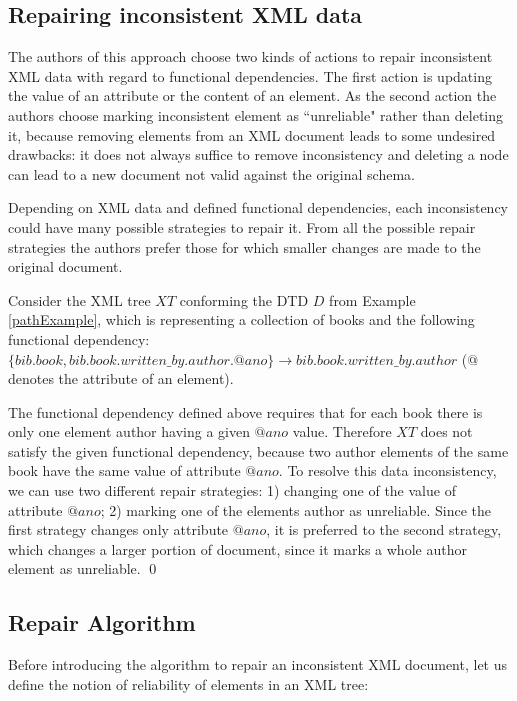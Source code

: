 \subsection{Repairing inconsistent XML data}

The authors of this approach choose two kinds of actions to repair inconsistent XML data with regard to functional dependencies. The first action is updating the value of an attribute or the content of an element. As the second action the authors choose marking inconsistent element as ``unreliable" rather than deleting it, because removing elements from an XML document leads to some undesired drawbacks: it does not always suffice to remove inconsistency and deleting a node can lead to a new document not valid against the original schema.

Depending on XML data and defined functional dependencies, each inconsistency could have many possible strategies to repair it. From all the possible repair strategies the authors prefer those for which smaller changes are made to the original document.

\begin{example}\label{fdrepairExample}
Consider the XML tree $XT$ conforming the DTD $D$ from Example \ref{pathExample}, which is representing a collection of books and the following functional dependency:\\ $\{bib.book, bib.book.written\_by.author.@ano\} \rightarrow bib.book.written\_by.author$ ($@$ denotes the attribute of an element).

The functional dependency defined above requires that for each book there is only one element author having a given $@ano$ value. Therefore $XT$ does not satisfy the given functional dependency, because two author elements of the same book have the same value of attribute $@ano$. To resolve this data inconsistency, we can use two different repair strategies: 1) changing one of the value of attribute $@ano$; 2) marking one of the elements author as unreliable. Since the first strategy changes only attribute $@ano$, it is preferred to the second strategy, which changes a larger portion of document, since it marks a whole author element as unreliable.
\qed
\end{example}


\subsection{Repair Algorithm}

Before introducing the algorithm to repair an inconsistent XML document, let us define the notion of reliability of elements in an XML tree:

